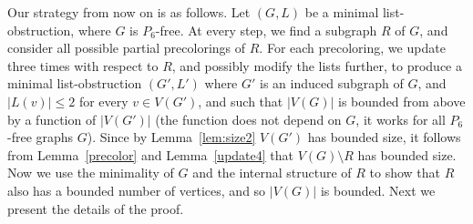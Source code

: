 \documentclass[11pt]{article}
\begin{document}
Our strategy from now on is as follows. 
Let $(G,L)$ be a minimal list-obstruction, where $G$ is $P_6$-free.
At every step, we find a subgraph $R$ of $G$, and consider all  possible 
partial precolorings of $R$.
For each precoloring, we update three times with respect to $R$, and possibly
modify the lists further, to produce
a minimal list-obstruction $(G',L')$ where $G'$ is an induced subgraph of $G$, 
and $|L(v)| \leq 2 $ for every $v \in V(G')$, and such that
$|V(G)|$ is bounded from above by a function of $|V(G')|$ (the function does not depend on $G$, it works for all $P_6$-free graphs $G$).
Since by Lemma~\ref{lem:size2} $V(G')$ has bounded size,
it follows from Lemma~\ref{precolor} and Lemma~\ref{update4}  that 
$V(G) \setminus R$ has bounded size. 
Now we use the minimality of $G$ and the internal structure of $R$ to show 
that $R$ also has a bounded number of vertices, and so $|V(G)|$ is bounded.
Next we present the details of the proof.
\end{document}
